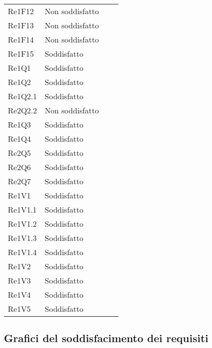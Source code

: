 \begin{longtable}{C{3cm} C{3cm} L{5.5cm} C{3cm}}
Re1F12 & Non soddisfatto\\
Re1F13 & Non soddisfatto\\
Re1F14 & Non soddisfatto\\
Re1F15 & Soddisfatto\\
Re1Q1 & Soddisfatto\\
Re1Q2 & Soddisfatto\\
Re1Q2.1 & Soddisfatto\\
Re2Q2.2 & Non soddisfatto\\
Re1Q3 & Soddisfatto\\
Re1Q4 & Soddisfatto\\
Re2Q5 & Soddisfatto\\
Re2Q6 & Soddisfatto\\
Re2Q7 & Soddisfatto\\
Re1V1 & Soddisfatto\\
Re1V1.1 & Soddisfatto\\
Re1V1.2 & Soddisfatto\\
Re1V1.3 & Soddisfatto\\
Re1V1.4 & Soddisfatto\\
Re1V2 & Soddisfatto\\
Re1V3 & Soddisfatto\\
Re1V4 & Soddisfatto\\
Re1V5 & Soddisfatto\\
\end{longtable}

\subsection{Grafici del soddisfacimento dei requisiti}